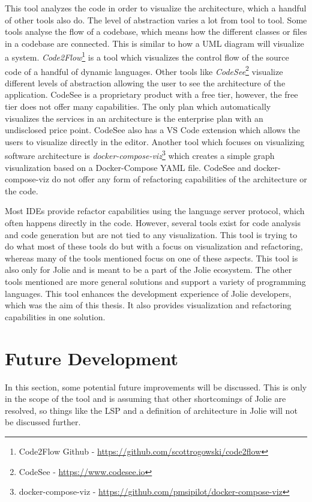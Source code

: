 This tool analyzes the code in order to visualize the architecture, which a handful of other tools also do. 
The level of abstraction varies a lot from tool to tool. Some tools analyse the flow of a codebase, which means how the different classes or files in 
a codebase are connected. This is similar to how a UML diagram will visualize a system. \emph{Code2Flow}\footnote{Code2Flow Github - \url{https://github.com/scottrogowski/code2flow}} is a tool which visualizes the control flow of the source code of a handful of dynamic languages. Other tools like \emph{CodeSee}\footnote{CodeSee - \url{https://www.codesee.io}} visualize different levels of abstraction allowing the user to see the architecture of the application.
CodeSee is a proprietary product with a free tier, however, the free tier does not offer many capabilities.
The only plan which automatically visualizes the services in an architecture is the enterprise plan with an undisclosed price point. 
CodeSee also has a VS Code extension which allows the users to visualize directly in the editor. Another tool which focuses on visualizing software architecture 
is \emph{docker-compose-viz}\footnote{docker-compose-viz - \url{https://github.com/pmsipilot/docker-compose-viz}} which creates a simple graph visualization based on a Docker-Compose YAML file.
CodeSee and docker-compose-viz do not offer any form of refactoring capabilities of the architecture or the code.

Most IDEs provide refactor capabilities using the language server protocol, which often happens directly in the code.
However, several tools exist for code analysis and code generation but are not tied to any visualization.
This tool is trying to do what most of these tools do but with a focus on visualization and refactoring, whereas many of the tools mentioned focus on one of these aspects.
This tool is also only for Jolie and is meant to be a part of the Jolie ecosystem. The other tools mentioned are more general solutions and support a variety of programming languages.
This tool enhances the development experience of Jolie developers, which was the aim of this thesis. It also provides visualization and refactoring capabilities in one solution.

\section{Future Development}
In this section, some potential future improvements will be discussed.
This is only in the scope of the tool and is assuming that other shortcomings of Jolie are resolved, so things like the LSP and a definition of architecture in Jolie will not be discussed further.

